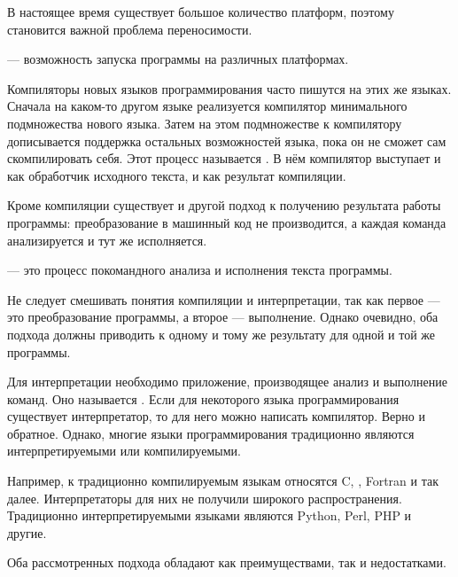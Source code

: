 В настоящее время существует большое количество платформ, поэтому
становится важной проблема переносимости.

\begin{defn}
   — возможность запуска программы на различных
  платформах.
\end{defn}

Компиляторы новых языков программирования часто пишутся на этих же
языках. Сначала на каком-то другом языке реализуется компилятор
минимального подмножества нового языка. Затем на этом подмножестве к
компилятору дописывается поддержка остальных возможностей языка, пока
он не сможет сам скомпилировать себя. Этот процесс называется
. В нём компилятор
выступает и как обработчик исходного текста, и как результат
компиляции.


Кроме компиляции существует и другой подход к получению результата
работы программы: преобразование в машинный код не производится, а
каждая команда анализируется и тут же исполняется.

\begin{defn}
   — это процесс покомандного
  анализа и исполнения текста программы.
\end{defn}

Не следует смешивать понятия компиляции и интерпретации, так как первое
— это преобразование программы, а второе — выполнение. Однако очевидно,
оба подхода должны приводить к одному и тому же результату для одной
и той же программы.

Для интерпретации необходимо приложение, производящее анализ и
выполнение команд. Оно называется
. Если для некоторого языка
программирования существует интерпретатор, то для него можно написать
компилятор. Верно и обратное. Однако, многие языки программирования
традиционно являются интерпретируемыми или компилируемыми.

Например, к традиционно компилируемым языкам относятся C, \CPP,
Fortran и так далее. Интерпретаторы для них не получили широкого
распространения.  Традиционно интерпретируемыми языками являются
Python, Perl, PHP и другие.


Оба рассмотренных подхода обладают как преимуществами, так и
недостатками.

